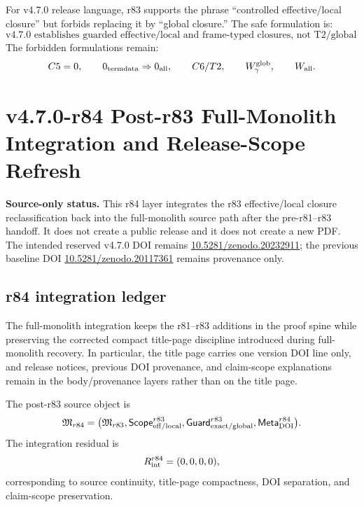 For v4.7.0 release language, r83 supports the phrase ``controlled effective/local
closure'' but forbids replacing it by ``global closure.''  The safe formulation is:
\[
\boxed{\text{v4.7.0 establishes guarded effective/local and frame-typed closures, not T2/global closure.}}
\]
The forbidden formulations remain:
\[
C5=0,
\qquad
0_{\rm termdata}\Rightarrow0_{\rm all},
\qquad
C6/T2,
\qquad
W_{\gamma}^{\rm glob},
\qquad
W_{\rm all}.
\]


\clearpage
\section*{v4.7.0-r84 Post-r83 Full-Monolith Integration and Release-Scope Refresh}
\label{sec:r84-post-r83-full-monolith-release-scope-refresh}

\noindent\textbf{Source-only status.}
This r84 layer integrates the r83 effective/local closure reclassification back into the
full-monolith source path after the pre-r81--r83 handoff.  It does not create a public release and it
does not create a new PDF.  The intended reserved v4.7.0 DOI remains
\href{https://doi.org/10.5281/zenodo.20232911}{10.5281/zenodo.20232911}; the previous
baseline DOI \href{https://doi.org/10.5281/zenodo.20117361}{10.5281/zenodo.20117361} remains
provenance only.

\subsection*{r84 integration ledger}
\label{subsec:r84-integration-ledger}
The full-monolith integration keeps the r81--r83 additions in the proof spine while preserving
the corrected compact title-page discipline introduced during full-monolith recovery.  In particular,
the title page carries one version DOI line only, and release notices, previous DOI provenance,
and claim-scope explanations remain in the body/provenance layers rather than on the title page.

The post-r83 source object is
\[
\mathfrak M_{r84}
=\bigl(\mathfrak M_{r83},\mathsf{Scope}_{\rm eff/local}^{r83},
\mathsf{Guard}_{\rm exact/global}^{r83},\mathsf{Meta}_{\rm DOI}^{r84}\bigr).
\]
The integration residual is
\[
R_{\rm int}^{r84}=(0,0,0,0),
\]
corresponding to source continuity, title-page compactness, DOI separation, and claim-scope
preservation.


